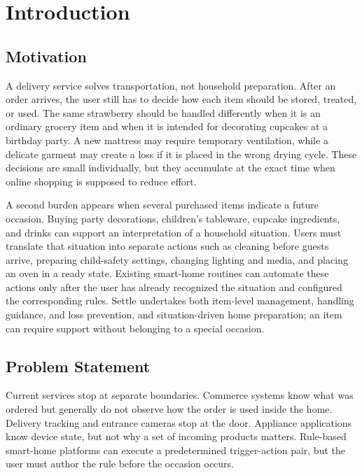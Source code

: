 \documentclass[conference]{IEEEtran}
\begin{document}
\section{Introduction}

\subsection{Motivation}

A delivery service solves transportation, not household preparation. After an order arrives, the user still has to decide how each item should be stored, treated, or used. The same strawberry should be handled differently when it is an ordinary grocery item and when it is intended for decorating cupcakes at a birthday party. A new mattress may require temporary ventilation, while a delicate garment may create a loss if it is placed in the wrong drying cycle. These decisions are small individually, but they accumulate at the exact time when online shopping is supposed to reduce effort.

A second burden appears when several purchased items indicate a future occasion. Buying party decorations, children's tableware, cupcake ingredients, and drinks can support an interpretation of a household situation. Users must translate that situation into separate actions such as cleaning before guests arrive, preparing child-safety settings, changing lighting and media, and placing an oven in a ready state. Existing smart-home routines can automate these actions only after the user has already recognized the situation and configured the corresponding rules. Settle undertakes both item-level management, handling guidance, and loss prevention, and situation-driven home preparation; an item can require support without belonging to a special occasion.

\subsection{Problem Statement}

Current services stop at separate boundaries. Commerce systems know what was ordered but generally do not observe how the order is used inside the home. Delivery tracking and entrance cameras stop at the door. Appliance applications know device state, but not why a set of incoming products matters. Rule-based smart-home platforms can execute a predetermined trigger-action pair, but the user must author the rule before the occasion occurs.
\end{document}
